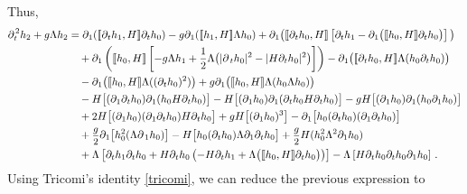 \documentclass[11pt]{article}
\theoremstyle{plain}
\theoremstyle{definition}
\theoremstyle{definition}
\def\p{\text{\bf\emph{p}}}
\def\p{{\partial\hspace{1pt}}}
\def\comm#1#2{{\llbracket#1,#2\rrbracket}}
\def\smallexp#1{{\text{\small #1}}}
\def\dfrac#1#2{\smallexp{$\displaystyle{}\frac{#1}{#2}$}}
\begin{document}
Thus,
\begin{align*}
\p_{\!t}^2 h_2 + g\Lambda h_2 &= \p_{\!1} (\comm{\p_{\!t} h_1}{H} \partial_t h_0) - g\p_{\!1} (\comm{h_1}{H} \Lambda h_0) + \p_{\!1} \big(\comm{\p_{\!t} h_0}{H} \left[\partial_t h_1-\p_{\!1} \big(\comm{h_0}{H} \partial_t h_0\big)\right]\big) \\
&\quad +\p_{\!1} \left(\comm{h_0}{H} \left[-g \Lambda h_1 + \frac{1}{2} \Lambda \big(|\p_t h_0|^2 - |H\partial_t h_0|^2 \big)\right]\right) - \p_{\!1} \big(\comm{\p_{\!t} h_0}{H} \Lambda (h_0 \partial_t h_0)\big) \\
&\quad - \p_{\!1} \big(\comm{h_0}{H} \Lambda ((\p_{\!t} h_0)^2)\big) + g\p_{\!1} \big(\comm{h_0}{H} \Lambda (h_0 \Lambda h_0)\big) \\
&\quad - H \big[(\p_{\!1} \p_{\!t} h_0) \p_{\!1}(h_0 H\p_{\!t} h_0)\big] - H \big[(\p_{\!1} h_0) \p_{\!1}(\p_{\!t} h_0 H\p_{\!t} h_0)\big]
 - gH \big[(\p_{\!1} h_0) \p_{\!1}(h_0 \partial_1 h_0)\big] \nonumber\\
&\quad + 2 H \big[(\p_{\!1}h_0) (\p_{\!1} \p_{\!t} h_0) H\p_{\!t} h_0\big] + gH \big[(\p_{\!1}h_0)^3\big] - \p_{\!1} \big[h_0 (\p_{\!t} h_0) (\partial_1 \p_{\!t} h_0) \big] \\
&\quad + \dfrac{g}{2} \p_{\!1} \big[h_0^2 (\Lambda \p_{1} h_0)\big] - H \big[h_0 (\p_{\!t} h_0)\Lambda \partial_1\p_{\!t} h_0\big] + \dfrac{g}{2} H (h_0^2 \Lambda^2 \partial_1h_0)\\
&\quad +\Lambda \left[\partial_t h_{1}\partial_t h_{0}  +H\p_{\!t} h_0\left(-H\p_{\!t} h_1 + \Lambda \big(\comm{h_0}{H}  \p_{\!t} h_0\big)\right)\right]- \Lambda \left[ H\p_{\!t} h_0 \partial_t h_{0} \p_{\!1} h_{0} \right]\,.
\end{align*}
Using Tricomi's identity \eqref{tricomi}, we can reduce the previous expression to
\end{document}

